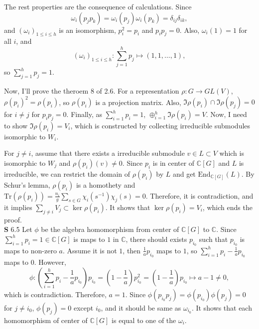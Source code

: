 \documentclass[a4paper, 12pt]{article}
\theoremstyle{Mydefinition}
\theoremstyle{Mytheorem}
\begin{document}
The rest properties are the consequence of calculations. Since 
\begin{equation}
    \omega_i(p_jp_k) = \omega_i(p_j)\omega_i(p_k)=\delta_{ij}\delta_{ik},
\end{equation}
and $(\omega_i)_{1\leq i\leq h}$ is an isomorphism, $p_i^2 = p_i$ and $p_ip_j = 0$. Also, $\omega_i(1) = 1$ for all $i$, and
\begin{equation}
    (\omega_i)_{1\leq i\leq h}:\sum_{j=1}^h p_j\mapsto (1,1,\ldots, 1),
\end{equation}
so $\sum_{j=1}^h p_j = 1$.

Now, I'll prove the theroem 8 of 2.6. For a representation $\rho:G\rightarrow GL(V)$, $\rho(p_i)^2 = \rho(p_i)$, so $\rho(p_i)$ is a projection matrix. Also, $\Im \rho(p_i)\cap \Im \rho(p_j) = 0$ for $i\neq j$ for $p_ip_j = 0$. Finally, as $\sum_{i=1}^h p_i = 1$, $\oplus_{i=1}^h \Im \rho(p_i) = V$. Now, I need to show $\Im\rho(p_i) = V_i$, which is constructed by collecting irreducible submodules isomorphic to $W_i$.

For $j\neq i$, assume that there exists a irreducible submodule $v\in L\subset V$ which is isomorphic to $W_j$ and $\rho(p_i)(v)\neq 0$. Since $p_i$ is in center of $\mathbb{C}[G]$ and $L$ is irreducible, we can restrict the domain of $\rho(p_i)$ by $L$ and get $\mathrm{End}_{\mathbb{C}[G]}(L)$. By Schur's lemma, $\rho(p_i)$ is a homothety and $\mathrm{Tr}(\rho(p_i)) = \frac{n_i}{g}\sum_{s\in G}\chi_i(s^{-1})\chi_j(s) = 0$. Therefore, it is contradiction, and it implies $\sum_{j\neq i} V_j\subset \ker \rho(p_i)$. It shows that $\ker \rho(p_i) = V_i$, which ends the proof.\\

\noindent \textbf{S} 6.5
Let $\phi$ be the algebra homomorphism from center of $\mathbb{C}[G]$ to $\mathbb{C}$. Since $\sum_{i=1}^h p_i = 1\in \mathbb{C}[G]$ is maps to $1$ in $\mathbb{C}$, there should exists $p_{i_0}$ such that $p_{i_0}$ is maps to non-zero $a$. Assume it is not $1$, then $\frac{1}{a}p_{i_0}$ maps to $1$, so $\sum_{i=1}^h p_i - \frac{1}{a}p_{i_0}$ maps to $0$. However,
\begin{equation}
    \phi:\left(\sum_{i=1}^h p_i - \frac{1}{a}p_{i_0}\right)p_{i_0} = \left(1-\frac{1}{a}\right)p_{i_0}^2 = \left(1-\frac{1}{a}\right)p_{i_0}\mapsto a-1\neq 0,
\end{equation}
which is contradiction. Therefore, $a=1$. Since $\phi(p_{i_0}p_j) = \phi(p_{i_0})\phi(p_j)=0$ for $j\neq i_0$, $\phi(p_j) = 0$ except $i_0$, and it should be same as $\omega_{i_0}$. It shows that each homomorphism of center of $\mathbb{C}[G]$ is equal to one of the $\omega_i$.\\
\end{document}
